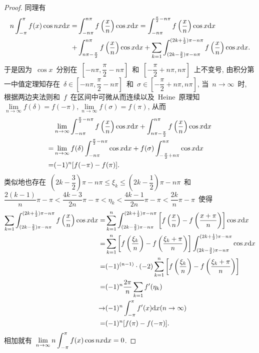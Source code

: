 \documentclass[UTF8,a4paper,20pt]{article}
\begin{document}
\begin{enumerate}
\begin{proof}
同理有
	\begin{equation*}
		\begin{split}
			n\int_{-\pi}^{\pi} f(x)\cos{nx}\mathrm{d}x=&\int_{-n\pi}^{n\pi}f\left(\dfrac{x}{n}\right)\cos{x}\mathrm{d}x=\int_{-n\pi}^{\frac{\pi}{2}-n\pi}f\left(\dfrac{x}{n}\right)\cos{x}\mathrm{d}x\\
			+&\int_{n\pi-\frac{\pi}{2}}^{n\pi}f\left(\dfrac{x}{n}\right)\cos{x}\mathrm{d}x+\sum_{k=1}\int_{(2k-\frac{3}{2})\pi-n\pi}^{(2k+\frac{1}{2})\pi-n\pi} f\left(\dfrac{x}{n}\right)\cos{x}\mathrm{d}x.
		\end{split}
	\end{equation*}
于是因为~$\cos{x}$~分别在~$[-n\pi,\dfrac{\pi}{2}-n\pi]$~和~$[-\dfrac{\pi}{2}+n\pi,n\pi]$~上不变号, 由积分第一中值定理知存在~$\delta\in[-n\pi,\dfrac{\pi}{2}-n\pi]$~和~$\sigma\in[-\dfrac{\pi}{2}+n\pi,n\pi]$, 当~$n\to\infty$~时, 根据两边夹法则和~$f$~在区间中可微从而连续以及~Heine~原理知~$\lim\limits_{n\to\infty} f(\delta)=f(-\pi), \lim\limits_{n\to\infty} f(\sigma)=f(\pi)$, 从而
	\begin{equation*}
		\begin{split}
			&\lim_{n\to\infty}\int_{-n\pi}^{\frac{\pi}{2}-n\pi}f\left(\dfrac{x}{n}\right)\cos{x}\mathrm{d}x+\int_{n\pi-\frac{\pi}{2}}^{n\pi}f\left(\dfrac{x}{n}\right)\cos{x}\mathrm{d}x\\
			=&\lim_{n\to\infty}f(\delta)\int_{-n\pi}^{\frac{\pi}{2}-n\pi} \cos{x}\mathrm{d}x+f(\sigma)\int_{-\frac{\pi}{2}+n\pi}^{n\pi}\cos{x}\mathrm{d}x\\
			=&(-1)^n[f(-\pi)-f(\pi)].
		\end{split}
	\end{equation*}
类似地也存在~$(2k-\dfrac{3}{2})\pi-n\pi\leqslant\xi_k\leqslant(2k-\dfrac{1}{2})\pi-n\pi$~和~$\dfrac{2(k-1)}{n}\pi-\pi<\dfrac{4k-3}{2n}\pi-\pi<\eta_k<\dfrac{4k-1}{2n}\pi-\pi<\dfrac{2k}{n}\pi-\pi$~使得
	\begin{equation*}
		\begin{split}
			\sum_{k=1}\int_{(2k-\frac{3}{2})\pi-n\pi}^{(2k+\frac{1}{2})\pi-n\pi} f\left(\dfrac{x}{n}\right)\cos{x}\mathrm{d}x=&\sum_{k=1}^n\int_{(2k-\frac{3}{2})\pi-n\pi}^{(2k+\frac{1}{2})\pi-n\pi}\left[f\left(\dfrac{x}{n}\right)-f\left(\dfrac{x+\pi}{n}\right)\right]\cos{x}\mathrm{d}x\\
			=&\sum_{k=1}^n\left[f\left(\dfrac{\xi_k}{n}\right)-f\left(\dfrac{\xi_k+\pi}{n}\right)\right]\int_{(2k-\frac{3}{2})\pi-n\pi}^{(2k+\frac{1}{2})\pi-n\pi}\cos{x}\mathrm{d}x\\
			=&(-1)^{(n-1)}\cdot(-2)\sum_{k=1}^n\left[f\left(\dfrac{\xi_k}{n}\right)-f\left(\dfrac{\xi_k+\pi}{n}\right)\right]\\
			=&(-1)^n\dfrac{2\pi}{n}\sum_{k=1}f'(\eta_k)\\
			\to&(-1)^n\int_{-\pi}^{\pi}f'(x)\mathrm{d}x(n\to\infty)\\
			=&(-1)^n[f(\pi)-f(-\pi)].
		\end{split}
	\end{equation*}
相加就有~$\displaystyle\lim\limits_{n\to\infty}n\int_{-\pi}^{\pi} f(x)\cos{nx}\mathrm{d}x=0$.
\end{proof}


\end{enumerate}
\end{document}
